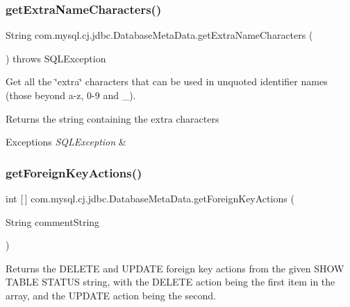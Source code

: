 \subsubsection{\texorpdfstring{get\+Extra\+Name\+Characters()}{getExtraNameCharacters()}}
{\footnotesize\ttfamily String com.\+mysql.\+cj.\+jdbc.\+Database\+Meta\+Data.\+get\+Extra\+Name\+Characters (\begin{DoxyParamCaption}{ }\end{DoxyParamCaption}) throws S\+Q\+L\+Exception}

Get all the \char`\"{}extra\char`\"{} characters that can be used in unquoted identifier names (those beyond a-\/z, 0-\/9 and \+\_\+).

\begin{DoxyReturn}{Returns}
the string containing the extra characters 
\end{DoxyReturn}

\begin{DoxyExceptions}{Exceptions}
{\em S\+Q\+L\+Exception} & \\
\hline
\end{DoxyExceptions}
\mbox{\label{classcom_1_1mysql_1_1cj_1_1jdbc_1_1_database_meta_data_a0becadcb3e84a1149a496560177d0170}} 
\subsubsection{\texorpdfstring{get\+Foreign\+Key\+Actions()}{getForeignKeyActions()}}
{\footnotesize\ttfamily int \mbox{[}$\,$\mbox{]} com.\+mysql.\+cj.\+jdbc.\+Database\+Meta\+Data.\+get\+Foreign\+Key\+Actions (\begin{DoxyParamCaption}\item[{String}]{comment\+String }\end{DoxyParamCaption})\hspace{0.3cm}{\ttfamily [protected]}}

Returns the D\+E\+L\+E\+TE and U\+P\+D\+A\+TE foreign key actions from the given \textquotesingle{}S\+H\+OW T\+A\+B\+LE S\+T\+A\+T\+US\textquotesingle{} string, with the D\+E\+L\+E\+TE action being the first item in the array, and the U\+P\+D\+A\+TE action being the second.


